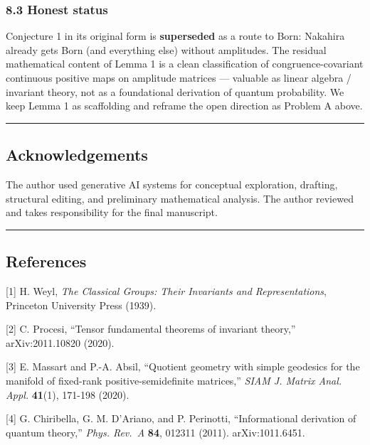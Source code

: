 \documentclass[
]{article}
\begin{document}
\subsubsection{8.3 Honest status}\label{honest-status}

Conjecture 1 in its original form is \textbf{superseded} as a route to
Born: Nakahira already gets Born (and everything else) without
amplitudes. The residual mathematical content of Lemma 1 is a clean
classification of congruence-covariant continuous positive maps on
amplitude matrices --- valuable as linear algebra / invariant theory,
not as a foundational derivation of quantum probability. We keep Lemma 1
as scaffolding and reframe the open direction as Problem A above.

\begin{center}\rule{0.5\linewidth}{0.5pt}\end{center}

\subsection{Acknowledgements}\label{acknowledgements}

The author used generative AI systems for conceptual exploration,
drafting, structural editing, and preliminary mathematical analysis. The
author reviewed and takes responsibility for the final manuscript.

\begin{center}\rule{0.5\linewidth}{0.5pt}\end{center}

\subsection{References}\label{references}

{[}1{]} H. Weyl, \emph{The Classical Groups: Their Invariants and
Representations}, Princeton University Press (1939).

{[}2{]} C. Procesi, ``Tensor fundamental theorems of invariant theory,''
arXiv:2011.10820 (2020).

{[}3{]} E. Massart and P.-A. Absil, ``Quotient geometry with simple
geodesics for the manifold of fixed-rank positive-semidefinite
matrices,'' \emph{SIAM J. Matrix Anal. Appl.} \textbf{41}(1), 171-198
(2020).

{[}4{]} G. Chiribella, G. M. D'Ariano, and P. Perinotti, ``Informational
derivation of quantum theory,'' \emph{Phys. Rev.~A} \textbf{84}, 012311
(2011). arXiv:1011.6451.
\end{document}
